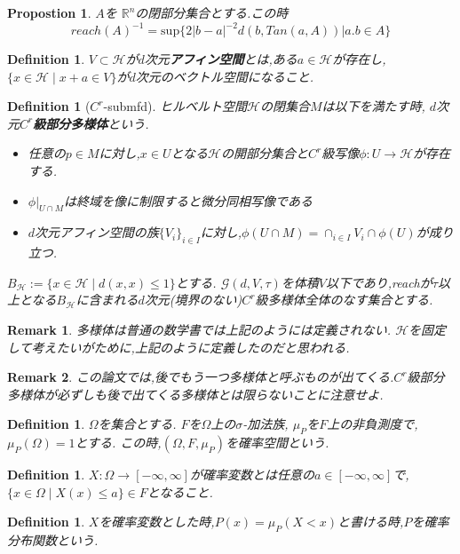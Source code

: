 \documentclass{jarticle}
\newtheorem{dfn}[thm]{Definition}
\newtheorem{prop}[thm]{Propostion}
\newtheorem*{rem}{Remark}
\newcommand{\gdvt}{\mathcal{G}(d,V,\tau)}
\begin{document}
\begin{prop} $A$を $\mathbb{R}^n$の閉部分集合とする.この時
  \begin{equation*}
   reach(A)^{-1}=\mathrm{sup}\{2|b-a|^{-2}d(b,Tan(a,A)) | a.b \in A\}
  \end{equation*}
\end{prop}
\begin{dfn}
 $V \subset \mathcal{H}$が$d$次元\textbf{アフィン空間}とは,ある$a \in \mathcal{H}$が存在し,$\{ x \in \mathcal{H} \mid x + a \in V \}$が$d$次元のベクトル空間になること.
\end{dfn}
\begin{dfn}[$C^r$-submfd]
ヒルベルト空間$\mathcal{H}$の閉集合$M$は以下を満たす時,
$d$次元$C^r$\textbf{級部分多様体}という.
\begin{itemize}
  \item 任意の$p \in M$に対し,$x \in U$となる$\mathcal{H}$の開部分集合と$C^r$級写像$\phi:U \to \mathcal{H}$が存在する.
  \item $\phi|_{U \cap M}$は終域を像に制限すると微分同相写像である
  \item $d$次元アフィン空間の族$\{ V_i \}_{i \in I}$に対し,$\phi(U \cap M)=\cap_{i \in I} V_i \cap \phi(U)$が成り立つ.
\end{itemize}
  $B_{\mathcal{H}}:= \{ x \in \mathcal{H} \mid d(x,x) \le 1 \}$とする.
$\gdvt$を体積$V$以下であり,reachが$\tau$以上となる$B_{\mathcal{H}}$に含まれる$d$次元(境界のない)$C^r$級多様体全体のなす集合とする.

\end{dfn}
\begin{rem}
 多様体は普通の数学書では上記のようには定義されない.
 $\mathcal{H}$を固定して考えたいがために,上記のように定義したのだと思われる.
\end{rem}
\begin{rem}
 この論文では,後でもう一つ多様体と呼ぶものが出てくる.$C^r$級部分多様体が必ずしも後で出てくる多様体とは限らないことに注意せよ.
\end{rem}

\begin{dfn}
 $\Omega$を集合とする.
 $F$を$\Omega$上の$\sigma$-加法族,
 $\mu_P$を$F$上の非負測度で,$\mu_P(\Omega)=1$とする.
 この時,$(\Omega,F,\mu_P)$を確率空間という.
\end{dfn}
\begin{dfn}
 $X:\Omega \to [-\infty,\infty]$が確率変数とは任意の$a \in [-\infty,\infty]$で,$\{x \in \Omega \mid X(x) \le a \} \in F$となること.
\end{dfn}
\begin{dfn}
 $X$を確率変数とした時,$P(x) = \mu_P(X <x)$と書ける時,$P$を確率分布関数という.
\end{dfn}
\end{document}
